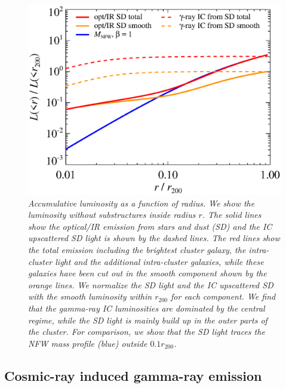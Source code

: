 \documentclass[10pt,aps,pra,reprint,amsmath,amsfonts,amssymb,showpacs,nofootinbib,floatfix]{revtex4-1}
\newcommand{\rvir}{r_{200}}
\begin{document}
\begin{figure}%
 \includegraphics[width=0.99\columnwidth]{figures/lum.stars.eps}
 \caption{\it Accumulative luminosity as a function of radius. We show
   the luminosity without substructures inside radius $r$. The solid
   lines show the optical/IR emission from stars and dust (SD) and the
   IC upscattered SD light is shown by the dashed lines. The red lines
   show the total emission including the brightest cluster galaxy, the
   intra-cluster light and the additional intra-cluster galaxies,
   while these galaxies have been cut out in the smooth component
   shown by the orange lines. We normalize the SD light and the IC
   upscattered SD with the smooth luminosity within $\rvir$ for each
   component. We find that the gamma-ray IC luminosities are dominated
   by the central regime, while the SD light is mainly build up in the
   outer parts of the cluster. For comparison, we show that the SD
   light traces the NFW mass profile (blue) outside $0.1\rvir$.}
 \label{fig:SD_lum}
\end{figure}


\subsection{Cosmic-ray induced gamma-ray emission}
\label{sect:CRs}
\end{document}
